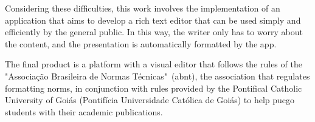 \documentclass[12pt,a4paper,oneside,brazil]{abntex2}
\begin{document}
Considering these difficulties, this work involves the implementation of an application that aims to develop a rich text editor that can be used simply and efficiently by the general public. In this way, the writer only has to worry about the content, and the presentation is automatically formatted by the app.

The final product is a platform with a visual editor that follows the rules of the "Associação Brasileira de Normas Técnicas"~(\acrshort{abnt}), the association that regulates formatting norms, in conjunction with rules provided by the Pontifical Catholic University of Goiás (Pontifícia Universidade Católica de Goiás) to help \acrshort{pucgo} students with their academic publications.

\clearpage


\listoffigures   %
\clearpage

\listoftables    %
\clearpage




\tableofcontents
\clearpage



\setcounter{page}{1}
\textual

\justifying
\normalfont






\end{document}

